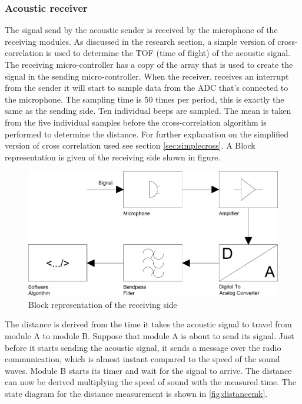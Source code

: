\documentclass[10pt,a4paper]{article}
\begin{document}
\subsubsection{Acoustic receiver}
The signal send by the acoustic sender is received by the microphone of the receiving modules. As discussed in the research section, a simple version of cross-correlation is used to determine the TOF (time of flight) of the acoustic signal. The receiving micro-controller has a copy of the array that is used to create the signal in the sending micro-controller.
When the receiver, receives an interrupt from the sender it will start to sample data from the ADC that's connected to the microphone. The sampling time is 50 times per period, this is exactly the same as the sending side. Ten individual beeps are sampled. The mean is taken from the five individual samples before the cross-correlation algorithm is performed to determine the distance. For further explanation on the simplified version of cross correlation used see section  \ref{sec:simplecross}. A Block representation is given of the receiving side shown in figure\label{fig:demodulatorblock}.

 \begin{figure}[h]
     \centering
     \includegraphics[width=1\textwidth]{Blokschemareceive.pdf}
     \caption{Block representation of the receiving side}
     \label{fig:demodulatorblock}
 \end{figure}

The distance is derived from the time it takes the acoustic signal to travel from module A to module B. 
Suppose that module A is about to send its signal. Just before it starts sending the acoustic signal, it sends a message over the radio communication, which is almost instant compared to the speed of the sound waves. Module B starts its timer and wait for the signal to arrive. The distance can now be derived multiplying the speed of sound with the measured time. The state diagram for the distance measurement is shown in \ref{fig:distancemk}.
\end{document}
